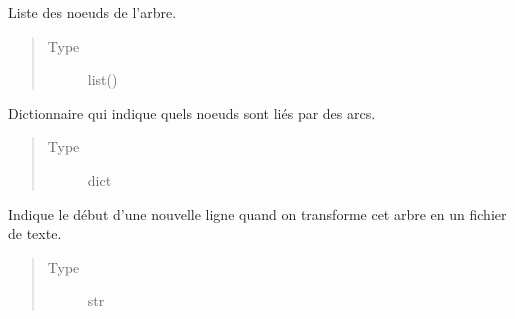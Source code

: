 \documentclass[letterpaper,10pt,french]{sphinxmanual}
\begin{document}
\begin{fulllineitems}
\begin{fulllineitems}
\end{fulllineitems}


\begin{fulllineitems}
\label{\detokenize{index:StrategyTree.StrategyTree._nodes}}
Liste des noeuds de l’arbre.
\begin{quote}\begin{description}
\item[{Type}] \leavevmode
list({\hyperref[\detokenize{index:StrategyTree.NodeST}]{}})

\end{description}\end{quote}

\end{fulllineitems}


\begin{fulllineitems}
\label{\detokenize{index:StrategyTree.StrategyTree._adj_dict}}
Dictionnaire qui indique quels noeuds sont liés par des arcs.
\begin{quote}\begin{description}
\item[{Type}] \leavevmode
dict

\end{description}\end{quote}

\end{fulllineitems}


\begin{fulllineitems}
\label{\detokenize{index:StrategyTree.StrategyTree.fout_newline}}
Indique le début d’une nouvelle ligne quand on transforme cet arbre en
un fichier de texte.
\begin{quote}\begin{description}
\item[{Type}] \leavevmode
str


\end{description}
\end{quote}
\end{fulllineitems}
\end{fulllineitems}
\end{document}
